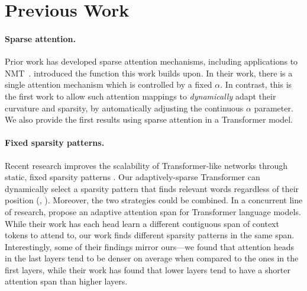 \section{Previous Work}

\paragraph*{Sparse attention.}
Prior work has developed sparse attention mechanisms, including
applications to NMT~\citep{sparsemax, malaviya2018sparse, fusedmax,
    shao2019ssn, maruf2019selective}. \citet{entmax} introduced the
\entmaxtext function this work builds upon. In their work, there is a
single attention mechanism which is controlled by a fixed $\alpha$.
In contrast, this is the first work to allow such attention mappings
to \emph{dynamically} adapt their curvature and sparsity, by
automatically adjusting the continuous $\alpha$ parameter. We also
provide the first results using sparse attention in a Transformer
model.

\paragraph*{Fixed sparsity patterns.}
Recent research improves the scalability of Transformer-like networks
through static, fixed sparsity patterns
\citep{openai_sparse_transf,dynamic_conv}. Our adaptively-sparse
Transformer can dynamically select a sparsity pattern that finds
relevant words regardless of their position (\eg,
). Moreover, the two strategies could be
combined. In a concurrent line of research, \citet{Sukhbaatar2019}
propose an adaptive attention span for Transformer language models.
While their work has each head learn a different contiguous span of
context tokens to attend to, our work finds different sparsity
patterns in the same span. Interestingly, some of their findings
mirror ours---we found that attention heads in the last layers tend
to be denser on average when compared to the ones in the first
layers, while their work has found that lower layers tend to have a
shorter attention span than higher layers.

